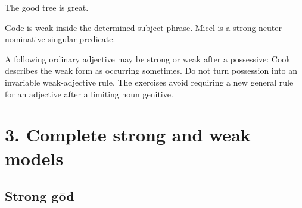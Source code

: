 The good tree is great.

Gōde is weak inside the determined subject phrase. Micel is a strong neuter nominative singular predicate.

A following ordinary adjective may be strong or weak after a possessive: Cook describes the weak form as occurring sometimes. Do not turn possession into an invariable weak-adjective rule. The exercises avoid requiring a new general rule for an adjective after a limiting noun genitive.

\clearpage
\section*{3. Complete strong and weak models}

\subsection*{Strong gōd}

